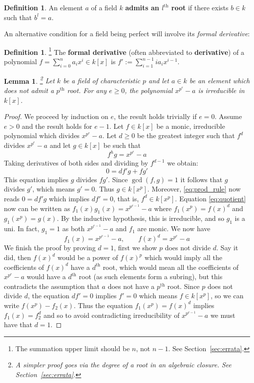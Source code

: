 \documentclass[12pt]{article}
\theoremstyle{plain}
\newtheorem{lemma}[thm]{Lemma}
\theoremstyle{definition}
\newtheorem{defn}[thm]{Definition} %
\begin{document}
%
\begin{defn}
\label{def:pthroot}
An element $a$ of a field $k$ \textbf{admits an $l^{\operatorname{th}}$ root} if there exists $b \in k$ such that $b^l = a$.
\end{defn}
%
An alternative condition for a field being perfect will involve its \emph{formal derivative}:
\begin{defn}\footnote{The summation upper limit should be $n$, not $n-1$. See Section~\ref{sec:errata}.}
The \textbf{formal derivative} (often abbreviated to \textbf{derivative}) of a polynomial $f = \sum_{i = 0}^n a_i x^i \in k[x]$ is $f' := \sum_{i = 1}^{n-1} ia_ix^{i-1}$.
\end{defn}
\begin{lemma}
\label{lem:irred_example}\footnote{A simpler proof goes via the degree of a root in an algebraic closure. See Section~\ref{sec:errata}.}
Let $k$ be a field of characteristic $p$ and let $a \in k$ be an element which does not admit a $p^\text{th}$ root. For any $e \geq 0$, the polynomial $x^{p^e} - a$ is irreducible in $k[x]$.
\end{lemma}
\begin{proof}
We proceed by induction on $e$, the result holds trivially if $e = 0$. Assume $e > 0$ and the result holds for $e-1$. Let $f \in k[x]$ be a monic, irreducible polynomial which divides $x^{p^e} - a$. Let $d \geq 0$ be the greatest integer such that $f^d$ divides $x^{p^e} - a$ and let $g \in k[x]$ be such that 
\begin{equation}
\label{eq:quotient}
f^h g = x^{p^e} - a
\end{equation}
Taking derivatives of both sides and dividing by $f^{d-1}$ we obtain:
\begin{equation}
\label{eq:prod_rule}
0 = df'g + fg'
\end{equation}
This equation implies $g$ divides $fg'$. Since $\operatorname{gcd}(f,g) = 1$ it follows that $g$ divides $g'$, which means $g' = 0$. Thus $g \in k[x^p]$. Moreover, \eqref{eq:prod_rule} now reads $0 = df'g$ which implies $df' = 0$, that is, $f^d \in k[x^p]$. Equation \eqref{eq:quotient} now can be written as $f_1(x)g_1(x) = x^{p^{e-1}} - a$ where $f_1(x^p) = f(x)^d$ and $g_1(x^p) = g(x)$. By the inductive hypothesis, this is irreducible, and so $g_1$ is a uni. In fact, $g_1 = 1$ as both $x^{p^{e-1}} - a$ and $f_1$ are monic. We now have \[f_1(x) = x^{p^{e-1}} - a,\qquad f(x)^d = x^{p^e} - a\]
We finish the proof by proving $d = 1$, first we show $p$ does not divide $d$. Say it did, then $f(x)^d$ would be a power of $f(x)^p$ which would imply all the coefficients of $f(x)^d$ have a $d^{\operatorname{th}}$ root, which would mean all the coefficients of $x^{p^e} - a$ would have a $d^{\operatorname{th}}$ root (as such elements form a subring), but this contradicts the assumption that $a$ does not have a $p^{\operatorname{th}}$ root. Since $p$ does not divide $d$, the equation $df' = 0$ implies $f' = 0$ which means $f \in k[x^p]$, so we can write $f(x^p) - f_2(x)$. Thus the equation $f_1(x^p) = f(x)^d$ implies $f_1(x) = f_2^d$ and so to avoid contradicting irreducibility of $x^{p^{e-1}}-a$ we must have that $d = 1$.
\end{proof}
\end{document}
